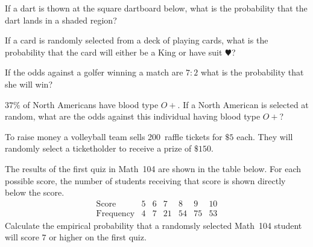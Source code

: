 \documentclass[addpoints,12pt]{exam}
\begin{document}
\begin{questions}
\question[10] If a dart is thown at the square dartboard below,
what is the probability that the dart lands in a shaded region?

\question[10] If a card is randomly selected from a deck
of playing cards, what is the probability that the card
will either be a King or have suit $\varheart$?

\question[10] If the odds against a golfer winning a match
are $7:2$ what is the probability that she will win?

\question[10] $37\%$ of North Americans have blood type $O+$.
If a North American is selected at random, what are the odds
against this individual having blood type $O+$?

\question[12] To raise money a volleyball team sells 200~raffle tickets
for $\$5$ each. They will randomly select a ticketholder to receive
a prize of $\$150$.

\question[10] The results of the first quiz in Math~104 are
shown in the table below. For each possible score, the number
of students receiving that score is shown directly below
the score.
\[\begin{array}{c|ccccccc}
\text{Score}&5&6&7&8&9&10\\\hline
\text{Frequency}&4&7&21&54&75&53
\end{array}\]
Calculate the empirical probability that a randomsly
selected Math~104 student will score $7$ or higher
on the first quiz.

\end{questions}
\end{document}
